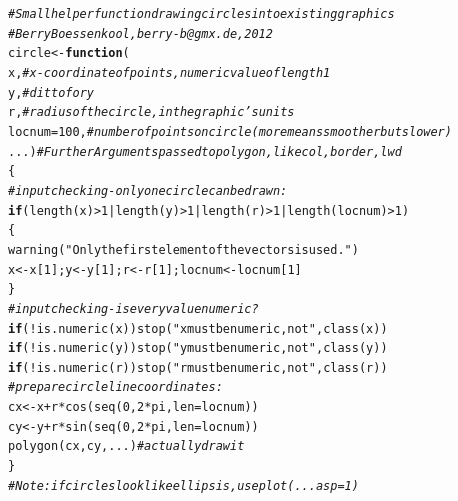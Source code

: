 \documentclass[xcolor=table,      handout ,    xcolor=dvipsnames]{beamer}\usepackage[]{graphicx}\usepackage[]{color}
\makeatletter
\newcommand{\hlnum}[1]{\textcolor[rgb]{0,0,0}{#1}}
\newcommand{\hlstr}[1]{\textcolor[rgb]{0.545,0.137,0.137}{#1}}
\newcommand{\hlcom}[1]{\textcolor[rgb]{0,0.392,0}{\textit{#1}}}
\newcommand{\hlopt}[1]{\textcolor[rgb]{0,0,0}{#1}}
\newcommand{\hlstd}[1]{\textcolor[rgb]{0,0,0}{#1}}
\newcommand{\hlkwa}[1]{\textcolor[rgb]{1,0,0}{\textbf{#1}}}
\newcommand{\hlkwb}[1]{\textcolor[rgb]{0,0,0}{#1}}
\newcommand{\hlkwc}[1]{\textcolor[rgb]{1,0,1}{#1}}
\newcommand{\hlkwd}[1]{\textcolor[rgb]{0,0,1}{#1}}
\newenvironment{kframe}{%
 \def\at@end@of@kframe{}%
 \ifinner\ifhmode%
  \def\at@end@of@kframe{\end{minipage}}%
  \begin{minipage}{\columnwidth}%
 \fi\fi%
 \def\FrameCommand##1{\hskip\@totalleftmargin \hskip-\fboxsep
 \colorbox{shadecolor}{##1}\hskip-\fboxsep
     \hskip-\linewidth \hskip-\@totalleftmargin \hskip\columnwidth}%
 \MakeFramed {\advance\hsize-\width
   \@totalleftmargin\z@ \linewidth\hsize
   \@setminipage}}%
 {\par\unskip\endMakeFramed%
 \at@end@of@kframe}
\newenvironment{knitrout}{}{} %
\makeatother
\begin{document}
\begin{frame}[fragile]
\begin{knitrout}\scriptsize
{}\color{fgcolor}\begin{kframe}
\begin{alltt}
\hlcom{# Small helper function drawing circles into existing graphics}
\hlcom{# Berry Boessenkool, berry-b@gmx.de, 2012}
\hlstd{circle} \hlkwb{<-} \hlkwa{function}\hlstd{(}
  \hlkwc{x}\hlstd{,} \hlcom{# x-coordinate of points, numeric value of length 1}
  \hlkwc{y}\hlstd{,} \hlcom{# ditto for y}
  \hlkwc{r}\hlstd{,} \hlcom{# radius of the circle, in the graphic's units}
  \hlkwc{locnum}\hlstd{=}\hlnum{100}\hlstd{,} \hlcom{# number of points on circle (more means smoother but slower)}
  \hlkwc{...}\hlstd{)} \hlcom{# Further Arguments passed to polygon, like col, border, lwd}
 \hlstd{\{}
 \hlcom{# input checking - only one circle can be drawn:}
 \hlkwa{if}\hlstd{(}\hlkwd{length}\hlstd{(x)} \hlopt{>}\hlnum{1} \hlopt{|} \hlkwd{length}\hlstd{(y)} \hlopt{>}\hlnum{1} \hlopt{|} \hlkwd{length}\hlstd{(r)} \hlopt{>}\hlnum{1} \hlopt{|} \hlkwd{length}\hlstd{(locnum)} \hlopt{>}\hlnum{1}\hlstd{)}
   \hlstd{\{}
   \hlkwd{warning}\hlstd{(}\hlstr{"Only the first element of the vectors is used."}\hlstd{)}
   \hlstd{x} \hlkwb{<-} \hlstd{x[}\hlnum{1}\hlstd{]; y} \hlkwb{<-} \hlstd{y[}\hlnum{1}\hlstd{]; r} \hlkwb{<-} \hlstd{r[}\hlnum{1}\hlstd{]; locnum} \hlkwb{<-} \hlstd{locnum[}\hlnum{1}\hlstd{]}
   \hlstd{\}}
 \hlcom{# input checking - is every value numeric?}
 \hlkwa{if}\hlstd{(}\hlopt{!}\hlkwd{is.numeric}\hlstd{(x))} \hlkwd{stop}\hlstd{(}\hlstr{"x must be numeric, not "}\hlstd{,} \hlkwd{class}\hlstd{(x))}
 \hlkwa{if}\hlstd{(}\hlopt{!}\hlkwd{is.numeric}\hlstd{(y))} \hlkwd{stop}\hlstd{(}\hlstr{"y must be numeric, not "}\hlstd{,} \hlkwd{class}\hlstd{(y))}
 \hlkwa{if}\hlstd{(}\hlopt{!}\hlkwd{is.numeric}\hlstd{(r))} \hlkwd{stop}\hlstd{(}\hlstr{"r must be numeric, not "}\hlstd{,} \hlkwd{class}\hlstd{(r))}
 \hlcom{# prepare circle line coordinates:}
 \hlstd{cx} \hlkwb{<-} \hlstd{x}\hlopt{+}\hlstd{r}\hlopt{*}\hlkwd{cos}\hlstd{(} \hlkwd{seq}\hlstd{(}\hlnum{0}\hlstd{,}\hlnum{2}\hlopt{*}\hlstd{pi,}\hlkwc{len}\hlstd{=locnum) )}
 \hlstd{cy} \hlkwb{<-} \hlstd{y}\hlopt{+}\hlstd{r}\hlopt{*}\hlkwd{sin}\hlstd{(} \hlkwd{seq}\hlstd{(}\hlnum{0}\hlstd{,}\hlnum{2}\hlopt{*}\hlstd{pi,}\hlkwc{len}\hlstd{=locnum) )}
 \hlkwd{polygon}\hlstd{(cx, cy, ...)} \hlcom{# actually draw it}
 \hlstd{\}}
\hlcom{# Note: if circles look like ellipsis, use plot(... asp=1)}
\end{alltt}
\end{kframe}
\end{knitrout}
\end{frame}
\end{document}
